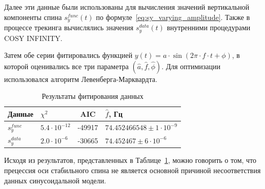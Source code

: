 Далее эти данные были использованы для вычисления значений вертикальной компоненты спина $s_y^{func}(t)$ по формуле~\ref{eq:sy_varying_amplitude}. Также в процессе трекинга вычислялись значения $s_y^{data}(t)$ внутренними процедурами COSY INFINITY.

Затем обе серии фитировались функцией $y(t) = a\cdot \sin(2\pi\cdot f\cdot t + \phi)$, в которой оценивались все три параметра $(\hat a,\hat f,\hat \phi)$. Для оптимизации использовался алгоритм Левенберга-Марквардта.

\begin{table}[h]%
	\centering
	\changecaptionwidth\captionwidth{12cm}
	\caption{Результаты фитирования данных\label{tbl:smp-comparison}}
	\begin{tabular}{l|lcl}
		\toprule
		Данные & $\chi^2$ & AIC\footnotemark & $\hat f$, Гц\\
		\midrule
		$s_y^{func}$& $5.4\cdot 10^{-12}$& -49917& $74.452466548 \pm 1\cdot 10^{-9}$\\
		$s_y^{data}$& $2.0\cdot 10^{-6}$& -30665 & $74.452467 \pm 6\cdot 10^{-6}$\\\bottomrule
	\end{tabular}
\end{table}

Исходя из результатов, представленных в Таблице~\ref{tbl:smp-comparison}, можно говорить о том, что прецессия оси стабильного спина не является основной причиной несоответствия данных синусоидальной модели.